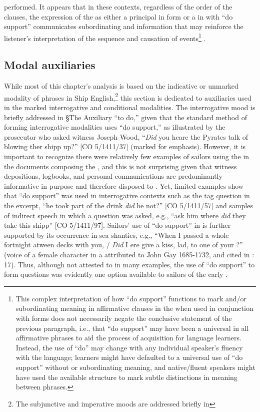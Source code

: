 performed. It appears that in these contexts, regardless of the order of the clauses, the expression of the  as either a principal  in  form or a  in  with “do support” communicates subordinating and  information that may reinforce the listener’s interpretation of the sequence and causation of events\footnote{This complex interpretation of how “do support” functions to mark  and/or subordinating meaning in affirmative clauses in the  when used in conjunction with  forms does not necessarily negate the conclusive statement of the previous paragraph, i.e., that “do support” may have been a universal in all affirmative  phrases to aid the process of acquisition for language learners. Instead, the use of “do” may change with any individual speaker’s fluency with the language; learners might have defaulted to a universal use of “do support” without  or subordinating meaning, and native/fluent speakers might have used the available structure to mark subtle distinctions in meaning between  phrases.} .  

\subsection{{Modal auxiliaries}}\label{sec:6.4.3}

While most of this chapter’s analysis is based on the indicative or unmarked modality of  phrases in Ship English,\footnote{The subjunctive and imperative moods are addressed briefly in } this section is dedicated to auxiliaries used in the marked interrogative and conditional modalities. The interrogative mood is briefly addressed in §The Auxiliary “to do,” given that the standard method of forming interrogative modalities uses “do support,” as illustrated by the prosecutor who asked witness Joseph Wood, “\textit{Did} you heare the Pyrates talk of blowing ther shipp up?” [CO 5/1411/37] (marked for emphasis). However, it is important to recognize there were relatively few examples of sailors using the  in the documents composing the , and this is not surprising given that witness depositions, logbooks, and personal communications are predominantly informative in purpose and therefore disposed to . Yet, limited examples show that “do support” was used in interrogative contexts such as the tag question in the excerpt, “he took part of the drink \textit{did} he not?” [CO 5/1411/57] and samples of indirect speech in which a question was asked, e.g., “ask him where \textit{did} they take this shipp” [CO 5/1411/97]. Sailors’ use of “do support” in  is further supported by its occurrence in sea shanties, e.g., “When I passed a whole fortnight atween decks with you, / \textit{Did} I ere give a kiss, lad, to one of your ?” (voice of a female character in a  attributed to John Gay 1685-1732, and cited in \citealt{Hugill1969}: 17). Thus, although not attested to in many examples, the use of “do support” to form questions was evidently one option available to sailors of the early .   

